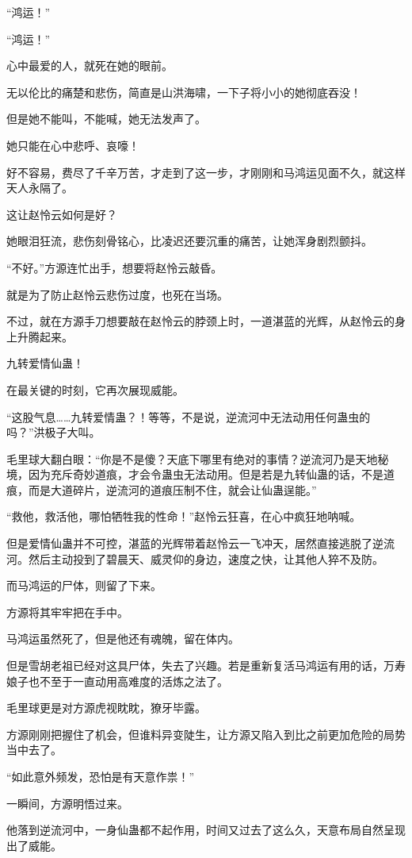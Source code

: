 \begin{this_body}
“鸿运！”

“鸿运！”

心中最爱的人，就死在她的眼前。

无以伦比的痛楚和悲伤，简直是山洪海啸，一下子将小小的她彻底吞没！

但是她不能叫，不能喊，她无法发声了。

她只能在心中悲呼、哀嚎！

好不容易，费尽了千辛万苦，才走到了这一步，才刚刚和马鸿运见面不久，就这样天人永隔了。

这让赵怜云如何是好？

她眼泪狂流，悲伤刻骨铭心，比凌迟还要沉重的痛苦，让她浑身剧烈颤抖。

“不好。”方源连忙出手，想要将赵怜云敲昏。

就是为了防止赵怜云悲伤过度，也死在当场。

不过，就在方源手刀想要敲在赵怜云的脖颈上时，一道湛蓝的光辉，从赵怜云的身上升腾起来。

九转爱情仙蛊！

在最关键的时刻，它再次展现威能。

“这股气息……九转爱情蛊？！等等，不是说，逆流河中无法动用任何蛊虫的吗？”洪极子大叫。

毛里球大翻白眼：“你是不是傻？天底下哪里有绝对的事情？逆流河乃是天地秘境，因为充斥奇妙道痕，才会令蛊虫无法动用。但是若是九转仙蛊的话，不是道痕，而是大道碎片，逆流河的道痕压制不住，就会让仙蛊逞能。”

“救他，救活他，哪怕牺牲我的性命！”赵怜云狂喜，在心中疯狂地呐喊。

但是爱情仙蛊并不可控，湛蓝的光辉带着赵怜云一飞冲天，居然直接逃脱了逆流河。然后主动投到了碧晨天、威灵仰的身边，速度之快，让其他人猝不及防。

而马鸿运的尸体，则留了下来。

方源将其牢牢把在手中。

马鸿运虽然死了，但是他还有魂魄，留在体内。

但是雪胡老祖已经对这具尸体，失去了兴趣。若是重新复活马鸿运有用的话，万寿娘子也不至于一直动用高难度的活炼之法了。

毛里球更是对方源虎视眈眈，獠牙毕露。

方源刚刚把握住了机会，但谁料异变陡生，让方源又陷入到比之前更加危险的局势当中去了。

“如此意外频发，恐怕是有天意作祟！”

一瞬间，方源明悟过来。

他落到逆流河中，一身仙蛊都不起作用，时间又过去了这么久，天意布局自然呈现出了威能。


\end{this_body}
